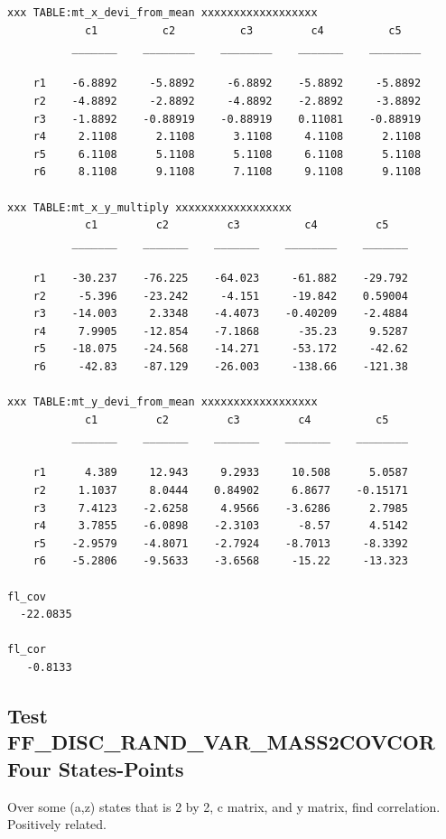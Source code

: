 \documentclass[
]{book}
\begin{document}
\begin{verbatim}
xxx TABLE:mt_x_devi_from_mean xxxxxxxxxxxxxxxxxx
            c1          c2          c3         c4          c5   
          _______    ________    ________    _______    ________

    r1    -6.8892     -5.8892     -6.8892    -5.8892     -5.8892
    r2    -4.8892     -2.8892     -4.8892    -2.8892     -3.8892
    r3    -1.8892    -0.88919    -0.88919    0.11081    -0.88919
    r4     2.1108      2.1108      3.1108     4.1108      2.1108
    r5     6.1108      5.1108      5.1108     6.1108      5.1108
    r6     8.1108      9.1108      7.1108     9.1108      9.1108

xxx TABLE:mt_x_y_multiply xxxxxxxxxxxxxxxxxx
            c1         c2         c3          c4         c5   
          _______    _______    _______    ________    _______

    r1    -30.237    -76.225    -64.023     -61.882    -29.792
    r2     -5.396    -23.242     -4.151     -19.842    0.59004
    r3    -14.003     2.3348    -4.4073    -0.40209    -2.4884
    r4     7.9905    -12.854    -7.1868      -35.23     9.5287
    r5    -18.075    -24.568    -14.271     -53.172     -42.62
    r6     -42.83    -87.129    -26.003     -138.66    -121.38

xxx TABLE:mt_y_devi_from_mean xxxxxxxxxxxxxxxxxx
            c1         c2         c3         c4          c5   
          _______    _______    _______    _______    ________

    r1      4.389     12.943     9.2933     10.508      5.0587
    r2     1.1037     8.0444    0.84902     6.8677    -0.15171
    r3     7.4123    -2.6258     4.9566    -3.6286      2.7985
    r4     3.7855    -6.0898    -2.3103      -8.57      4.5142
    r5    -2.9579    -4.8071    -2.7924    -8.7013     -8.3392
    r6    -5.2806    -9.5633    -3.6568     -15.22     -13.323

fl_cov
  -22.0835

fl_cor
   -0.8133
\end{verbatim}

\hypertarget{test-ff_disc_rand_var_mass2covcor-four-states-points}{%
\subsection{Test FF\_DISC\_RAND\_VAR\_MASS2COVCOR Four States-Points}\label{test-ff_disc_rand_var_mass2covcor-four-states-points}}

Over some (a,z) states that is 2 by 2, c matrix, and y matrix, find
correlation. Positively related.
\end{document}

